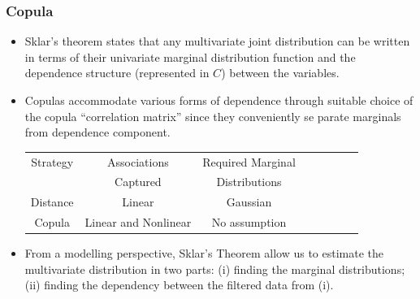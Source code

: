 \documentclass[pdf,9pt,xcolor=dvipsnames,hide notes]{beamer}
\begin{document}
\begin{frame}[label=frame4b]
	\frametitle{Copula}
	
	\begin{itemize}
	\justifying
		
		\item Sklar's theorem states that any multivariate joint distribution can be written in terms of their univariate marginal distribution function and the dependence structure (represented in $C$) between the variables.
		
		\vspace{0.3cm}
		
		\item Copulas accommodate various forms of dependence through suitable choice of the copula ``correlation matrix'' since they conveniently se \linebreak parate marginals from dependence component.
		
		\vspace{0.3cm}
		
		
		\begin{table}[ht]
			\centering
			\begin{tabular}{c|ccccccc}
				\hline
				\rowcolor{corn}
				Strategy & Associations & Required Marginal \\
				\rowcolor{corn}
				& Captured & Distributions \\
				\hline
				Distance& Linear & Gaussian \\
				Copula& Linear and Nonlinear & No assumption \\
				\hline
			\end{tabular}
		\end{table}
		
		\vspace{0.3cm}
			
		\item From a modelling perspective, Sklar's Theorem allow us to estimate the multivariate distribution in two parts: (i) finding the marginal distributions; (ii) finding the dependency between the filtered data from (i).
		
	\end{itemize}
\end{frame}
\end{document}
